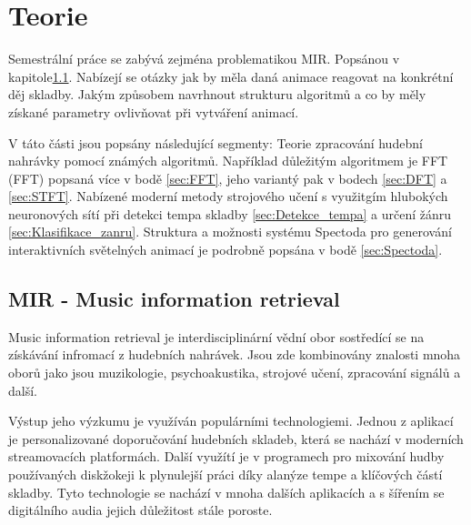 \chapter{Teorie}

Semestrální práce se zabývá zejména problematikou \acs{MIR}. Popsánou v kapitole\ref{sec:MIR}.
Nabízejí se otázky jak by měla daná animace reagovat na konkrétní děj skladby.
Jakým způsobem navrhnout strukturu algoritmů a co by měly získané parametry ovlivňovat při vytváření animací.

V táto části jsou popsány následující segmenty: Teorie zpracování hudební nahrávky pomocí známých algoritmů. Například důležitým algoritmem je \acs{FFT} (\acl{FFT})
popsaná více v bodě \ref{sec:FFT}, jeho variantý pak v bodech \ref{sec:DFT} a \ref{sec:STFT}.
Nabízené moderní metody strojového učení s využitgím hlubokých neuronových sítí při detekci tempa skladby \ref{sec:Detekce_tempa} a určení žánru \ref{sec:Klasifikace_zanru}.  
Struktura a možnosti systému Spectoda pro generování interaktivních světelných animací je podrobně popsána v bodě \ref{sec:Spectoda}.

\section{MIR - Music information retrieval} \label{sec:MIR}
    Music information retrieval je interdisciplinární vědní obor sostředící se na získávání infromací z hudebních nahrávek.
    Jsou zde kombinovány znalosti mnoha oborů jako jsou muzikologie, psychoakustika, strojové učení, zpracování signálů a další. 
    

    Výstup jeho výzkumu je využíván populárními technologiemi. 
    Jednou z aplikací je personalizované doporučování hudebních skladeb, která se nachází v moderních streamovacích platformách.
    Další využítí je v programech pro mixování hudby používaných diskžokeji k plynulejší práci díky alanýze tempe a klíčových částí skladby.
    Tyto technologie se nachází v mnoha dalších aplikacích a s šířením se digitálního audia jejich důležitost stále poroste.
    
